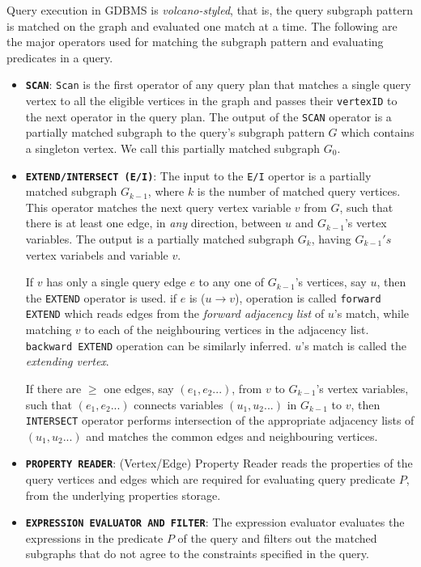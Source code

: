 Query execution in GDBMS is \emph{volcano-styled}, that is, the query subgraph pattern is matched on the graph and evaluated one match at a time. The following are the major operators used for matching the subgraph pattern and evaluating predicates in a query.
\begin{itemize}
	
	\item \textbf{\texttt{SCAN}}: \texttt{Scan} is the first operator of any query plan that matches a single query vertex to all the eligible vertices in the graph and passes their \texttt{vertexID} to the next operator in the query plan. The output of the \texttt{SCAN} operator is a partially matched subgraph to the query's subgraph pattern $G$ which contains a singleton vertex. We call this partially matched subgraph $G_0$.
	
	\item \textbf{\texttt{EXTEND/INTERSECT (E/I)}}: The input to the \texttt{E/I} opertor is a partially matched subgraph $G_{k-1}$, where $k$ is the number of matched query vertices. This operator matches the next query vertex variable $v$ from $G$, such that there is at least one edge, in \emph{any} direction, between $u$ and $G_{k-1}$'s vertex variables. The output is a partially matched subgraph $G_{k}$, having $G_{k-1}'s$ vertex variabels and variable $v$. 
	
	If $v$ has only a single query edge $e$ to any one of $G_{k-1}$'s vertices, say $u$, then the \texttt{EXTEND} operator is used. if $e$ is ($u\rightarrow v$), operation is called \texttt{forward EXTEND} which reads edges from the \emph{forward adjacency list} of $u$'s match, while matching $v$ to each of the neighbouring vertices in the adjacency list. \texttt{backward EXTEND} operation can be similarly inferred. $u$'s match is called the \emph{extending vertex}.
	
	If there are $\ge$ one edges, say $(e_1, e_2 ...)$, from $v$ to $G_{k-1}$'s vertex variables, such that $(e_1, e_2 ...)$ connects variables $(u_1, u_2 ...)$ in $G_{k-1}$ to $v$, then \texttt{INTERSECT} operator performs intersection of the appropriate adjacency lists of $(u_1, u_2 ...)$ and matches the common edges and neighbouring vertices.  
	
	\item \textbf{\texttt{PROPERTY READER}}: (Vertex/Edge) Property Reader reads the properties of the query vertices and edges which are required for evaluating query predicate $P$, from the underlying properties storage. 
	
	\item \textbf{\texttt{EXPRESSION EVALUATOR AND FILTER}}: The expression evaluator evaluates the expressions in the predicate $P$ of the query and filters out the matched subgraphs that do not agree to the constraints specified in the query.
	
\end{itemize}

